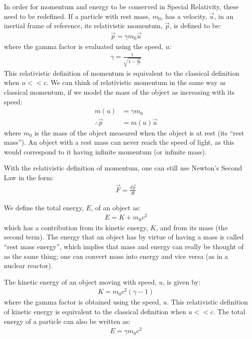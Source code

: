 \begin{chapterSummary}
In order for momentum and energy to be conserved in Special Relativity, these need to be redefined. If a particle with rest mass, $m_0$, has a velocity, $\vec u$, in an inertial frame of reference, its relativistic momentum, $\vec p$, is defined to be:
\begin{align*}
\vec p = \gamma m_0 \vec u
\end{align*}
where the gamma factor is evaluated using the speed, $u$:
\begin{align*}
\gamma = \frac{1}{\sqrt{1-\frac{u^2}{c^2}}}
\end{align*}
This relativistic definition of momentum is equivalent to the classical definition when $u<<c$. We can think of relativistic momentum in the same way as classical momentum, if we model the mass of the object as increasing with its speed:
\begin{align*}
m(u)&=\gamma m_0\\
\therefore \vec p &= m(u) \vec u
\end{align*}
where $m_0$ is the mass of the object measured when the object is at rest (its ``rest mass''). An object with a rest mass can never reach the speed of light, as this would correspond to it having infinite momentum (or infinite mass). 

With the relativistic definition of momentum, one can still use Newton's Second Law in the form:
\begin{align*}
\vec F = \frac{d\vec p}{dt}
\end{align*}

We define the total energy, $E$, of an object as:
\begin{align*}
E = K + m_0c^2
\end{align*}
which  has a contribution from its kinetic energy, $K$, and from its mass (the second term).  The energy that an object has by virtue of having a mass is called ``rest mass energy'', which implies that mass and energy can really be thought of as the same thing; one can convert mass into energy and vice versa (as in a nuclear reactor). 

The kinetic energy of an object moving with speed, $u$, is given by:
\begin{align*}
K = m_0c^2 (\gamma -1)
\end{align*}
where the gamma factor is obtained using the speed, $u$. This relativistic definition of kinetic energy is equivalent to the classical definition when $u<<c$. The total energy of a particle can also be written as:
\begin{align*}
E=\gamma m_0 c^2
\end{align*}


\end{chapterSummary}

